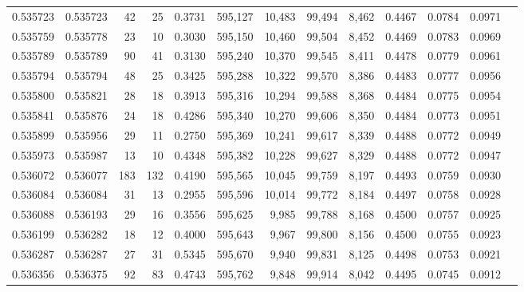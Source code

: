 \begin{tabular}{rrrrrrrrrrrrr}
0.535723 & 0.535723 &    42 &    25 &                                     0.3731 & 595,127 &  10,483 &  99,494 &   8,462 & 0.4467 & 0.0784 & 0.0971 \\
0.535759 & 0.535778 &    23 &    10 &                                     0.3030 & 595,150 &  10,460 &  99,504 &   8,452 & 0.4469 & 0.0783 & 0.0969 \\
0.535789 & 0.535789 &    90 &    41 &                                     0.3130 & 595,240 &  10,370 &  99,545 &   8,411 & 0.4478 & 0.0779 & 0.0961 \\
0.535794 & 0.535794 &    48 &    25 &                                     0.3425 & 595,288 &  10,322 &  99,570 &   8,386 & 0.4483 & 0.0777 & 0.0956 \\
0.535800 & 0.535821 &    28 &    18 &                                     0.3913 & 595,316 &  10,294 &  99,588 &   8,368 & 0.4484 & 0.0775 & 0.0954 \\
0.535841 & 0.535876 &    24 &    18 &                                     0.4286 & 595,340 &  10,270 &  99,606 &   8,350 & 0.4484 & 0.0773 & 0.0951 \\
0.535899 & 0.535956 &    29 &    11 &                                     0.2750 & 595,369 &  10,241 &  99,617 &   8,339 & 0.4488 & 0.0772 & 0.0949 \\
0.535973 & 0.535987 &    13 &    10 &                                     0.4348 & 595,382 &  10,228 &  99,627 &   8,329 & 0.4488 & 0.0772 & 0.0947 \\
0.536072 & 0.536077 &   183 &   132 &                                     0.4190 & 595,565 &  10,045 &  99,759 &   8,197 & 0.4493 & 0.0759 & 0.0930 \\
0.536084 & 0.536084 &    31 &    13 &                                     0.2955 & 595,596 &  10,014 &  99,772 &   8,184 & 0.4497 & 0.0758 & 0.0928 \\
0.536088 & 0.536193 &    29 &    16 &                                     0.3556 & 595,625 &   9,985 &  99,788 &   8,168 & 0.4500 & 0.0757 & 0.0925 \\
0.536199 & 0.536282 &    18 &    12 &                                     0.4000 & 595,643 &   9,967 &  99,800 &   8,156 & 0.4500 & 0.0755 & 0.0923 \\
0.536287 & 0.536287 &    27 &    31 &                                     0.5345 & 595,670 &   9,940 &  99,831 &   8,125 & 0.4498 & 0.0753 & 0.0921 \\
0.536356 & 0.536375 &    92 &    83 &                                     0.4743 & 595,762 &   9,848 &  99,914 &   8,042 & 0.4495 & 0.0745 & 0.0912 \\

\end{tabular}
